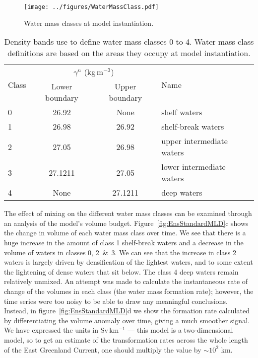 \begin{figure}[t]
    \centering
    \texttt{[image: ../figures/WaterMassClass.pdf]}
    \caption{Water mass classes at model instantiation.}
    \label{fig:WaterClass}
\end{figure}

\begin{table}[b]
    \centering
    \begin{tabular}{lccl}
        \hline
        \multirow{2}{*}{Class} & \multicolumn{2}{c}{$\gamma^n$ (kg\,m$^{-3}$)}  & \multirow{2}{*}{Name}     \\
        & Lower boundary & Upper boundary &                           \\ \hline \hline
        0                      & 26.92          & None           & shelf waters              \\
        1                      & 26.98          & 26.92          & shelf-break waters        \\
        2                      & 27.05          & 26.98          & upper intermediate waters \\
        3                      & 27.1211        & 27.05          & lower intermediate waters \\
        4                      & None           & 27.1211        & deep waters               \\ \hline
    \end{tabular}
    \caption{Density bands use to define water mass classes 0 to 4. Water mass class definitions are based on the areas they occupy at model instantiation.}
    \label{tab:Class}
\end{table}

The effect of mixing on the different water mass classes can be examined through an analysis of the model's volume budget. Figure~\ref{fig:EnsStandardMLD}c shows the change in volume of each water mass class over time. We see that there is a huge increase in the amount of class 1 shelf-break waters and a decrease in the volume of waters in classes 0, 2~\&~3. We can see that the increase in class 2 waters is largely driven by densification of the lightest waters, and to some extent the lightening of dense waters that sit below. The class 4 deep waters remain relatively unmixed. An attempt was made to calculate the instantaneous rate of change of the volumes in each class (the water mass formation rate); however, the time series were too noisy to be able to draw any meaningful conclusions. Instead, in figure~\ref{fig:EnsStandardMLD}d we show the formation rate calculated by differentiating the volume anomaly over time, giving a much smoother signal. We have expressed the units in Sv\,km$^{-1}$ --- this model is a two-dimensional model, so to get an estimate of the transformation rates across the whole length of the East Greenland Current, one should multiply the value by $\sim 10^2$ km.

